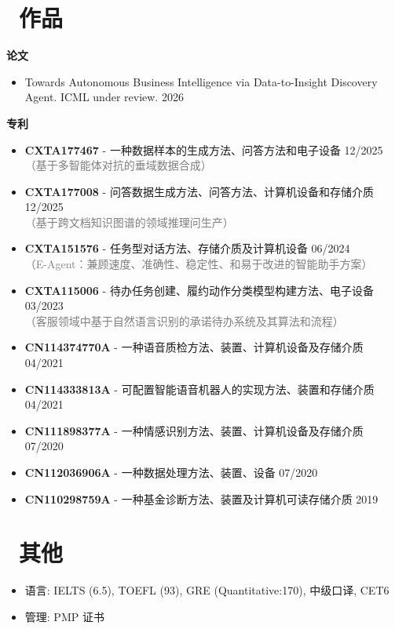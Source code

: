 \documentclass{resume}
\begin{document}
\section{\faHeartO\ 作品}
\textbf{论文}
\begin{itemize}[parsep=0.3ex]
  \item \textit{} Towards Autonomous Business Intelligence via Data-to-Insight Discovery Agent. ICML under review. \hfill 2026
\end{itemize}
\textbf{专利}
\begin{itemize}[parsep=0.3ex]
  \item \textbf{CXTA177467} - 一种数据样本的生成方法、问答方法和电子设备 \hfill 12/2025 \\
  {\small\textcolor{gray}{（基于多智能体对抗的垂域数据合成）}}
  
  \item \textbf{CXTA177008} - 问答数据生成方法、问答方法、计算机设备和存储介质 \hfill 12/2025 \\
  {\small\textcolor{gray}{（基于跨文档知识图谱的领域推理问生产）}}
  
  \item \textbf{CXTA151576} - 任务型对话方法、存储介质及计算机设备 \hfill 06/2024 \\
  {\small\textcolor{gray}{（E-Agent：兼顾速度、准确性、稳定性、和易于改进的智能助手方案）}}
  
  \item \textbf{CXTA115006} - 待办任务创建、履约动作分类模型构建方法、电子设备 \hfill 03/2023 \\
  {\small\textcolor{gray}{（客服领域中基于自然语言识别的承诺待办系统及其算法和流程）}}

  \item \textbf{CN114374770A} - ⼀种语⾳质检⽅法、装置、计算机设备及存储介质 \hfill 04/2021
  \item \textbf{CN114333813A} - 可配置智能语⾳机器⼈的实现⽅法、装置和存储介质 \hfill 04/2021
  \item \textbf{CN111898377A} - ⼀种情感识别⽅法、装置、计算机设备及存储介质 \hfill 07/2020
  \item \textbf{CN112036906A} - ⼀种数据处理⽅法、装置、设备 \hfill 07/2020
  \item \textbf{CN110298759A} - ⼀种基⾦诊断⽅法、装置及计算机可读存储介质 \hfill 2019
\end{itemize}

\section{\faInfo\ 其他}
\begin{itemize}[parsep=0.5ex]
  \item 语言: IELTS (6.5), TOEFL (93), GRE (Quantitative:170), 中级⼝译, CET6
  \item 管理: PMP 证书
\end{itemize}

%
%
\end{document}
